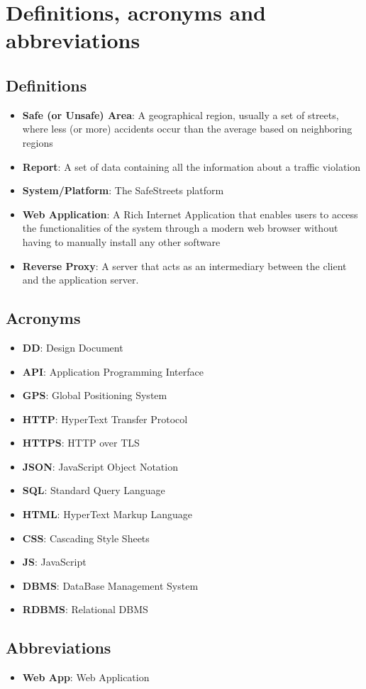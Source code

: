 \section{Definitions, acronyms and abbreviations}

\subsection{Definitions}
\begin{itemize}
  \item \textbf{Safe (or Unsafe) Area}: A geographical region, usually a set of streets, where less (or more) accidents occur than the average based on neighboring regions
  \item \textbf{Report}: A set of data containing all the information about a traffic violation
  \item \textbf{System/Platform}: The SafeStreets platform
  \item \textbf{Web Application}: A Rich Internet Application that enables users to access the functionalities of the system through a modern web browser without having to manually install any other software
  \item \textbf{Reverse Proxy}: A server that acts as an intermediary between the client and the application server.
\end{itemize}

\subsection{Acronyms}
\begin{itemize}
  \item \textbf{DD}: Design Document
  \item \textbf{API}: Application Programming Interface
  \item \textbf{GPS}: Global Positioning System
  \item \textbf{HTTP}: HyperText Transfer Protocol
  \item \textbf{HTTPS}: HTTP over TLS
  \item \textbf{JSON}: JavaScript Object Notation
  \item \textbf{SQL}: Standard Query Language
  \item \textbf{HTML}: HyperText Markup Language
  \item \textbf{CSS}: Cascading Style Sheets
  \item \textbf{JS}: JavaScript
  \item \textbf{DBMS}: DataBase Management System
  \item \textbf{RDBMS}: Relational DBMS
\end{itemize}

\subsection{Abbreviations}
\begin{itemize}
  \item \textbf{Web App}: Web Application
\end{itemize}